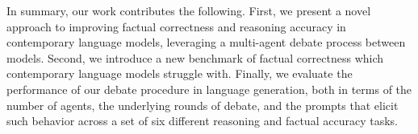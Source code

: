 In summary, our work contributes the following. First, we present a novel approach to improving factual correctness and reasoning accuracy in contemporary language models, leveraging a multi-agent debate process between models. Second, we introduce a new benchmark of factual correctness which contemporary language models struggle with. Finally, we evaluate the performance of our debate procedure in language generation, both in terms of the number of agents, the underlying rounds of debate, and the prompts that elicit such behavior across a set of six different reasoning and factual accuracy tasks.










